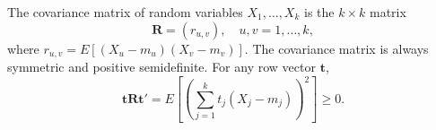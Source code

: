 The covariance matrix of random variables $X_1, \ldots, X_k$ is the $k \times k$ matrix
$$\mathbf{R} = (r_{u,v}), \quad u, v = 1, \ldots, k,$$
where $r_{u,v} = E[(X_u - m_u)(X_v - m_v)]$. The covariance matrix is always symmetric and positive semidefinite. For any row vector $\mathbf{t}$,
$$\mathbf{t} \mathbf{R} \mathbf{t}' = E\left[\left(\sum_{j=1}^{k} t_j (X_j - m_j)\right)^2\right] \geq 0.$$
